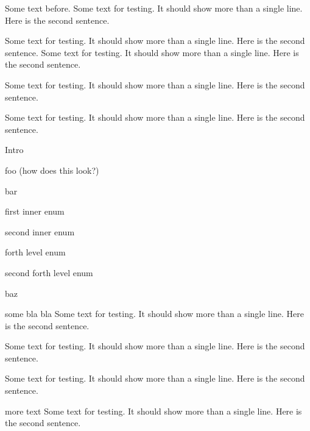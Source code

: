 \documentclass{article}
\begin{document}
\newcommand\sample{Some text for testing. It should show more than a single line. Here is the second sentence. }


\noindent Some text before. \sample
\begin{itemize}           %
  \begin{item} \sample \sample
  \end{item}
  \begin{item} \sample \par \sample
  \end{item}
  \begin{item} 
    Intro
    \begin{enumerate}       %
      \begin{item} foo (how does this look?)
      \end{item}
      \begin{item} bar
        \begin{enumerate}       %
          \begin{item} first inner enum
          \end{item}
          \begin{item} second inner enum
            \begin{enumerate}       %
              \begin{item} forth level enum
              \end{item}
              \begin{item} second forth level enum
              \end{item}
            \end{enumerate}
          \end{item}
        \end{enumerate}
      \end{item}
      \begin{item} baz
      \end{item}
    \end{enumerate}
    \begin{itemize}         %
      \begin{item}
        some bla bla \sample \par \sample
        \begin{enumerate}     %
          \begin{item}
            \sample
            \begin{itemize}     %
              \begin{item} more text \sample

\end{item}
\end{itemize}
\end{item}
\end{enumerate}
\end{item}
\end{itemize}
\end{item}
\end{itemize}
\end{document}
